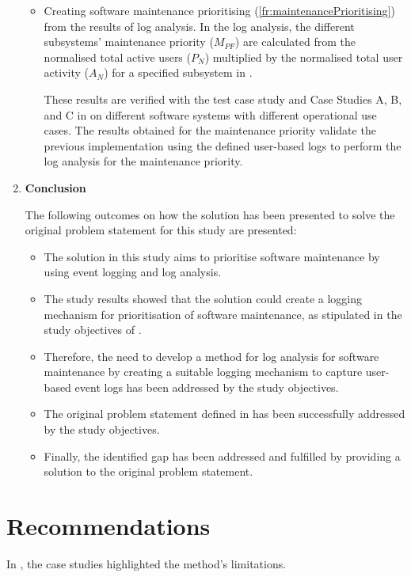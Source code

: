 \begin{enumerate}[label=\textbf{\Roman*.}]
\begin{itemize}
		\item Creating software maintenance prioritising (\ref{fr:maintenancePrioritising}) from the results of log analysis. In the log analysis, the different subsystems' maintenance priority ($M_{PF}$) are calculated from the normalised total active users ($P_N$) multiplied by the normalised total user activity ($A_N$) for a specified subsystem in . \par These results are verified with the test case study and Case Studies A, B, and C in  on different software systems with different operational use cases. The results obtained for the maintenance priority validate the previous implementation using the defined user-based logs to perform the log analysis for the maintenance priority. 
	\end{itemize}

	\clearpage

\item \textbf{Conclusion} \par The following outcomes on how the solution has been presented to solve the original problem statement for this study are presented:
	\begin{itemize}
		\item The solution in this study aims to prioritise software maintenance by using event logging and log analysis.
		\item The study results showed that the solution could create a logging mechanism for prioritisation of software maintenance, as stipulated in the study objectives of .
		\item Therefore, the need to develop a method for log analysis for software maintenance by creating a suitable logging mechanism to capture user-based event logs has been addressed by the study objectives.
		\item The original problem statement defined in  has been successfully addressed by the study objectives.
		\item Finally, the identified gap has been addressed and fulfilled by providing a solution to the original problem statement.
	\end{itemize}
\end{enumerate}

\section{Recommendations}
In , the case studies highlighted the method's limitations.

